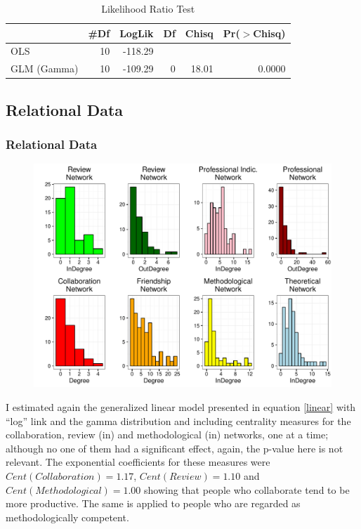 \documentclass[compress]{beamer}
\begin{document}
\begin{frame}
	\begin{table}[ht]
			\centering
			\footnotesize
			\caption{Likelihood Ratio Test}
			\label{lrtest}
		
		\begin{tabular}{lrrrrr}
				\hline
				& \#Df & LogLik & Df & Chisq & Pr($>$Chisq) \\ 
				\hline
				OLS & 10 & -118.29 &  &  &  \\ 
				GLM (Gamma) & 10 & -109.29 & 0 & 18.01 & 0.0000 \\   
				\hline
			\end{tabular}
	\end{table}
\end{frame}

\subsection{Relational Data}
\begin{frame}
	\frametitle{Relational Data}
	
	\begin{figure}[htb]
		\centering
		\includegraphics[scale=0.5]{degree_distributions.pdf}
	\end{figure}
\end{frame}

\begin{frame}
	\justify
	
	I estimated again the generalized linear model presented in equation \ref{linear} with ``log'' link and the gamma distribution and including centrality measures for the collaboration, review (in) and methodological (in) networks, one at a time; although no one of them had a significant effect, again, the p-value here is not relevant. The exponential coefficients for these measures were $Cent(Collaboration) = 1.17$, $Cent(Review) = 1.10$ and $Cent(Methodological) = 1.00$ showing that people who collaborate tend to be more productive. The same is applied to people who are regarded as methodologically competent.
	
\end{frame}
\end{document}
